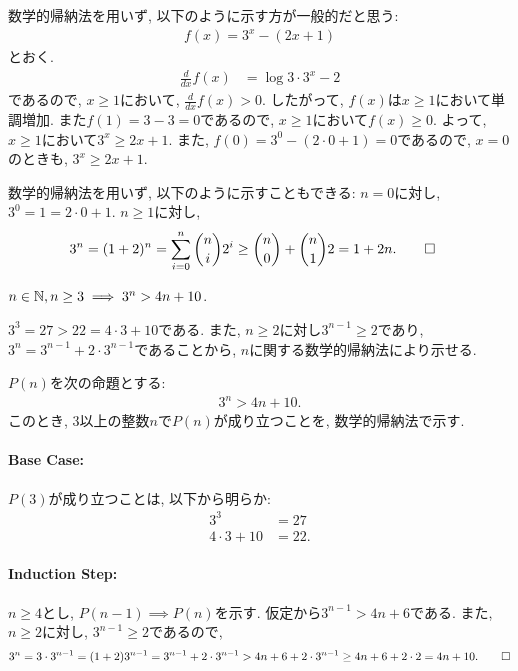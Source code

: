 \begin{rem}
  数学的帰納法を用いず, 以下のように示す方が一般的だと思う:
  \begin{align*}
    f(x)=3^x-(2x+1)
  \end{align*}
  とおく.
  \begin{align*}
    \frac{d}{dx}f(x)&=\log 3 \cdot 3^x-2
  \end{align*}
  であるので,
  $x\geq 1$において,
  $\frac{d}{dx}f(x)> 0$.
  したがって, $f(x)$は$x\geq 1$において単調増加.
  また$f(1)=3-3=0$であるので,
  $x\geq 1$において$f(x) \geq 0$.
  よって, $x\geq 1$において$3^x \geq 2x+1$.
  また, $f(0)=3^0-(2\cdot0+1)=0$であるので, $x=0$のときも,
  $3^x\geq 2x+1$.
\end{rem}
\begin{rem}
  数学的帰納法を用いず, 以下のように示すこともできる:
  $n=0$に対し, $3^0=1=2\cdot0+1$.
  $n\geq 1$に対し, 
  \begin{align*}
    3^n=(1+2)^n=\sum_{i=0}^n \binom{n}{i}2^i
    &\geq \binom{n}{0}+\binom{n}{1}2
    =1+2n
    .\qedhere
  \end{align*}
\end{rem}

\newest
\begin{prop}
  \label{p:20230820}
  $n\in\mathbb{N},n\geq 3\implies 3^n> 4n+10$.
\end{prop}
\begin{proof**}
  $3^{3}=27>22= 4\cdot 3+10$である.
  また, 
  $n\geq 2$に対し$3^{n-1}\geq 2$であり,
  $3^n=3^{n-1}+2\cdot 3^{n-1}$であることから,
  $n$に関する数学的帰納法により示せる.
\end{proof**}
\begin{proof*}
  $P(n)$を次の命題とする:
  \begin{align*}
    3^n> 4n+10
    .
  \end{align*}
  このとき,
  $3$以上の整数$n$で$P(n)$が成り立つことを,
  数学的帰納法で示す.

  \paragraph{Base Case:}
  $P(3)$が成り立つことは, 以下から明らか:
  \begin{align*}
    3^{3}&=27\\
     4\cdot 3+10&=22.
  \end{align*}
  \paragraph{Induction Step:}
  $n\geq 4$とし,
  $P(n-1)\implies P(n)$を示す.
  仮定から$3^{n-1}> 4n+6$である.
  また, 
  $n\geq 2$に対し, $3^{n-1}\geq 2$であるので,
  \begin{align*}
    3^n=3\cdot 3^{n-1}=(1+2)3^{n-1}=3^{n-1}+2\cdot 3^{n-1}> 4n+6+2\cdot 3^{n-1}\geq 4n+6+2\cdot 2=4n+10
    .\qedhere
  \end{align*}
\end{proof*}

